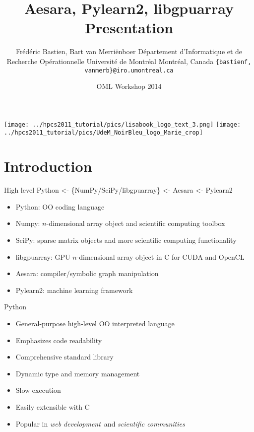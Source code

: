 \documentclass[utf8x,xcolor=pdftex,dvipsnames,table]{beamer}
\title{Aesara, Pylearn2, libgpuarray Presentation}
\author{%
\footnotesize
Frédéric Bastien, Bart van Merriënboer \newline
Département d'Informatique et de Recherche Opérationnelle \newline
Université de Montréal \newline
Montréal, Canada \newline
\texttt{\{bastienf, vanmerb\}@iro.umontreal.ca} \newline \newline
}
\date{OML Workshop 2014}
\begin{document}
\begin{frame}[plain]
 \titlepage
 \vspace{-5em}
 \texttt{[image: ../hpcs2011\_tutorial/pics/lisabook\_logo\_text\_3.png]}
 \hfill
 \texttt{[image: ../hpcs2011\_tutorial/pics/UdeM\_NoirBleu\_logo\_Marie\_crop]}
\end{frame}

\section{Introduction}
\begin{frame}{High level}\setcounter{page}{1}
  Python <- \{NumPy/SciPy/libgpuarray\} <- Aesara <- Pylearn2
  \begin{itemize}
  \item Python: OO coding language
  \item Numpy: $n$-dimensional array object and scientific computing toolbox
  \item SciPy: sparse matrix objects and more scientific computing functionality
  \item libgpuarray: GPU $n$-dimensional array object in C for CUDA and OpenCL
  \item Aesara: compiler/symbolic graph manipulation
  \item Pylearn2: machine learning framework
  \end{itemize}
\end{frame}



\begin{frame}{Python}
  \begin{itemize}
  \item General-purpose high-level OO interpreted language
  \item Emphasizes code readability
  \item Comprehensive standard library
  \item Dynamic type and memory management
  \item Slow execution
  \item Easily extensible with C
  \item Popular in {\em web development}\ and {\em scientific communities}
  \end{itemize}
\end{frame}
\end{document}
